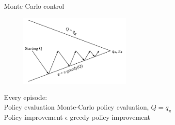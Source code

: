\bgroup
\begin{frame}{Monte-Carlo control}
\begin{figure}
\centering
\includegraphics[width=0.5\textwidth]{img/mc_control.pdf}
\end{figure}
\textcolor{mImagelabRed}{Every episode:}\\
\textcolor{mImagelabRed}{Policy evaluation} Monte-Carlo policy evaluation, $Q=q_{\pi}$\\
\textcolor{mImagelabRed}{Policy improvement} $\epsilon$-greedy policy improvement
\end{frame}
\egroup